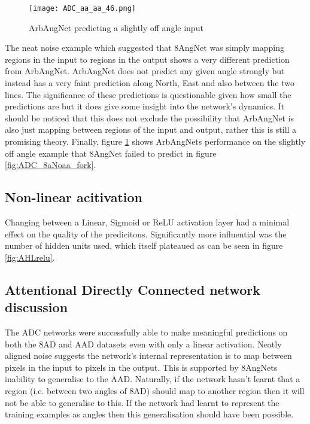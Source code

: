 \begin{figure}[h]
    \centering
    \texttt{[image: ADC\_aa\_aa\_46.png]}
    \caption{ArbAngNet predicting a slightly off angle input}
    \label{fig:ADC_aaaa_fork}
\end{figure}


The neat noise example which suggested that 8AngNet was simply mapping regions in the input to regions in the output shows a very different prediction from ArbAngNet.
ArbAngNet does not predict any given angle strongly but instead has a very faint prediction along North, East and also between the two lines. 
The significance of these predictions is questionable given how small the predictions are but it does give some insight into the network's dynamics.
It should be noticed that this does not exclude the possibility that ArbAngNet is also just mapping between regions of the input and output, rather this is still a promising theory.
Finally, figure \ref{fig:ADC_aaaa_fork} shows ArbAngNets performance on the slightly off angle example that 8AngNet failed to predict in figure \ref{fig:ADC_8aNoaa_fork}.

\subsection{Non-linear acitivation}
Changing between a Linear, Sigmoid or ReLU activation layer had a minimal effect on the quality of the predicitons.
Significantly more influential was the number of hidden units used, which itself plateaued as can be seen in figure \ref{fig:AHLrelu}.

\subsection{Attentional Directly Connected network discussion}
The ADC networks were successfully able to make meaningful predictions on both the 8AD and AAD datasets even with only a linear activation.
Neatly aligned noise suggests the network's internal representation is to map between pixels in the input to pixels in the output.
This is supported by 8AngNets inability to generalise to the AAD. 
Naturally, if the network hasn't learnt that a region (i.e. between two angles of 8AD) should map to another region then it will not be able to generalise to this. 
If the network had learnt to represent the training examples as angles then this generalisation should have been possible. 


